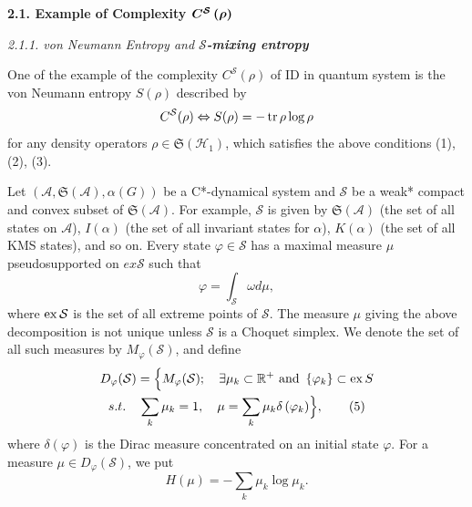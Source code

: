 \smallskip

\textbf{2.1. Example of Complexity  $  \boldsymbol{C^{\mathcal{S}}\left( \protect\rho %
\right) } $  }

\textit{2.1.1. von Neumann Entropy and  \bf  $  \boldsymbol{\mathcal{S}} $-mixing entropy}

One of the example of the complexity  $  C^{\mathcal{S}}({\rho }) $   of ID in
quantum system is the von Neumann entropy  $  {S( \rho) } $   \cite{nv:-Neu}  described by 
\[
C^{\mathcal{S}}( \rho) \Leftrightarrow {S( \rho)
=-\mathop{\rm tr}\rho \log \rho } 
\]%
for any density operators  $  \rho \in \mathfrak{S}\left( \mathcal{H}%
_{1}\right)  $,   which satisfies the above conditions (1), (2), (3).   


Let  $  (\mathcal{A},\mathfrak{S}(\mathcal{A}),\alpha (G)) $   be a C*-dynamical
system and  $  \mathcal{S} $   be a weak* compact and convex subset of  $  \mathfrak{S%
}(\mathcal{A}) $. For example,  $  \mathcal{S} $   is given by  $  \mathfrak{S}(%
\mathcal{A}) $   (the set of all states on  $  \mathcal{A} $),  $  I(\alpha ) $   (the
set of all invariant states for  $  \alpha  $),  $  K(\alpha ) $   (the set of all
KMS states), and so on. Every state  $  \varphi \in \mathcal{S} $   has a maximal
measure  $  \mu  $   pseudosupported on  $  ex\mathcal{S} $   such that 
\begin{equation}
\varphi =\int_{\mathcal{S}}\omega d\mu, 
\tag{4}
\end{equation}%
where  $  \mathop{\rm ex}\mathcal{S} $   is \noindent the set of all extreme points of  $  %
\mathcal{S} $.   The measure  $  \mu  $   giving the above decomposition is not
unique unless  $  \mathcal{S} $   is a Choquet simplex.   We denote the set of all
such measures by  $  M_{\varphi }(\mathcal{S}) $,   and define 
\begin{gather}
D_{\varphi }(\mathcal{S}) =\Bigl\{ M_{\varphi }(\mathcal{S});\quad \exists
\mu _{k}\subset \mathbb{R}^{+}\hbox{ and }\left\{ \varphi _{k}\right\}
\subset \mathop{\rm ex}S \\
s.t.\quad \sum_{k}\mu _{k}=1,\quad \mu =\sum_{k}\mu _{k}\delta
\left( \varphi _{k}\right) \Bigr\}, 
\tag{5}
\end{gather}%
\noindent where  $  \delta (\varphi ) $   is the Dirac measure concentrated on an
initial state  $  \varphi  $. For a measure  $  \mu \in D_{\varphi }(\mathcal{S}) $,  
we put 
\begin{equation}
H(\mu )=-\sum_{k}\mu _{k}\log \mu _{k}.
\tag{6}
\end{equation}%
